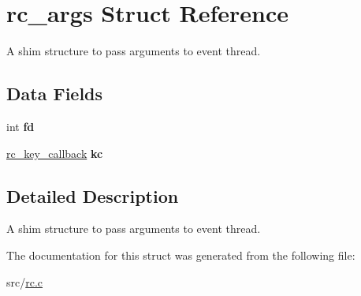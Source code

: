 \hypertarget{structrc__args}{}\section{rc\+\_\+args Struct Reference}
\label{structrc__args}


A shim structure to pass arguments to event thread.  


\subsection*{Data Fields}
\begin{DoxyCompactItemize}
\item 
int {\bfseries fd}\hypertarget{structrc__args_a0087985aae37c3acb4659f367022330a}{}\label{structrc__args_a0087985aae37c3acb4659f367022330a}

\item 
\hyperlink{group__rc_gaa7ca8d3e24ef0c270366ce6fd9bcd258}{rc\+\_\+key\+\_\+callback} {\bfseries kc}\hypertarget{structrc__args_af2a48ba3c9889e4e1cec2527ce56e974}{}\label{structrc__args_af2a48ba3c9889e4e1cec2527ce56e974}

\end{DoxyCompactItemize}


\subsection{Detailed Description}
A shim structure to pass arguments to event thread. 

The documentation for this struct was generated from the following file\+:\begin{DoxyCompactItemize}
\item 
src/\hyperlink{rc_8c}{rc.\+c}\end{DoxyCompactItemize}
